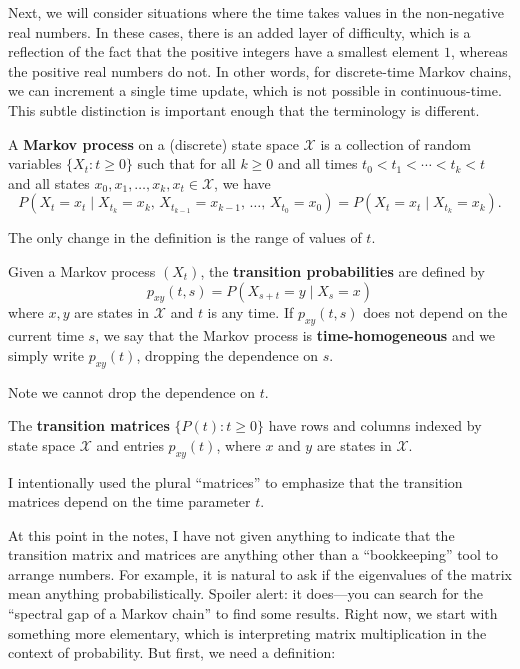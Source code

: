 \documentclass{ximera}
\begin{document}
Next, we will consider situations where the time takes values in the non-negative real numbers. In these
cases, there is an added layer of difficulty, which is a reflection of the fact that the positive integers have
a smallest element $1$, whereas the positive real numbers do not. In other words, for discrete-time Markov
chains, we can increment a single time update, which is not possible in continuous-time. This subtle
distinction is important enough that the terminology is different.

\begin{definition}
A \textbf{Markov process} on a (discrete) state space $\mathcal{X}$ is a collection of random variables
$\{X_t : t \geq 0\}$ such that for all $k \geq 0$ and all times $t_0 < t_1 < \cdots < t_k < t$ and all
states $x_0, x_1, \ldots, x_k, x_t \in \mathcal{X}$, we have
\[
P(X_t = x_t \mid X_{t_k} = x_k,\, X_{t_{k-1}} = x_{k-1},\, \ldots,\, X_{t_0} = x_0)
= P(X_t = x_t \mid X_{t_k} = x_k).
\]
\end{definition}

The only change in the definition is the range of values of $t$.

\begin{definition}
Given a Markov process $(X_t)$, the \textbf{transition probabilities} are defined by
\[
p_{xy}(t, s) = P(X_{s+t} = y \mid X_s = x)
\]
where $x, y$ are states in $\mathcal{X}$ and $t$ is any time. If $p_{xy}(t, s)$ does not depend on the
current time $s$, we say that the Markov process is \textbf{time-homogeneous} and we simply write
$p_{xy}(t)$, dropping the dependence on $s$.
\end{definition}

Note we cannot drop the dependence on $t$.

\begin{definition}
The \textbf{transition matrices} $\{P(t) : t \geq 0\}$ have rows and columns indexed by state space
$\mathcal{X}$ and entries $p_{xy}(t)$, where $x$ and $y$ are states in $\mathcal{X}$.
\end{definition}

I intentionally used the plural ``matrices'' to emphasize that the transition matrices depend on the time
parameter $t$.

At this point in the notes, I have not given anything to indicate that the transition matrix and matrices
are anything other than a ``bookkeeping'' tool to arrange numbers. For example, it is natural to ask if the
eigenvalues of the matrix mean anything probabilistically. Spoiler alert: it does---you can search for the
``spectral gap of a Markov chain'' to find some results. Right now, we start with something more
elementary, which is interpreting matrix multiplication in the context of probability. But first, we need a
definition:
\end{document}
